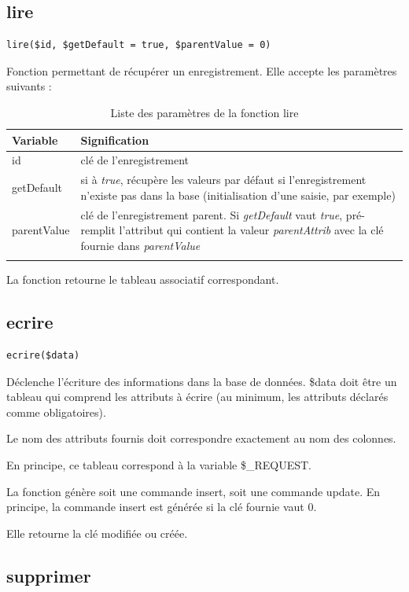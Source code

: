 \subsection{lire}
\begin{lstlisting}
lire($id, $getDefault = true, $parentValue = 0)
\end{lstlisting}

Fonction permettant de récupérer un enregistrement. Elle accepte les paramètres suivants :
\begin{longtable}{|p{3cm}|p{10cm}|}
\hline
\textbf{Variable} & \textbf{Signification} \\
\hline
\endhead
id & clé de l'enregistrement \\
\hline
getDefault & si à \textit{true}, récupère les valeurs par défaut si l'enregistrement n'existe pas dans la base (initialisation d'une saisie, par exemple)\\
\hline
parentValue & clé de l'enregistrement parent. Si \textit{getDefault} vaut \textit{true}, pré-remplit l'attribut qui contient la valeur \textit{parentAttrib} avec la clé fournie dans \textit{parentValue} \\
\hline

\caption{Liste des paramètres de la fonction lire}
\end{longtable}

La fonction retourne le tableau associatif correspondant.

\subsection{ecrire}
\begin{lstlisting}
ecrire($data)
\end{lstlisting}
Déclenche l'écriture des informations dans la base de données. \$data doit être un tableau qui comprend les attributs à écrire (au minimum, les attributs déclarés comme obligatoires).

Le nom des attributs fournis doit correspondre exactement au nom des colonnes.

En principe, ce tableau correspond à la variable \$\_REQUEST.

La fonction génère soit une commande insert, soit une commande update. En principe, la commande insert est générée si la clé fournie vaut 0.

Elle retourne la clé modifiée ou créée.

\subsection{supprimer}


